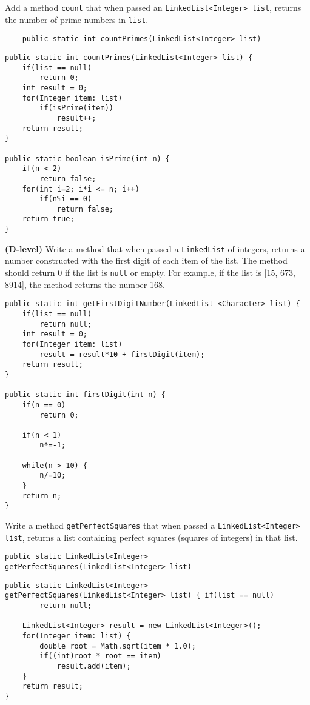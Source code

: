 \begin{questions}
\question Add a method \texttt{count} that when passed an \texttt{LinkedList<Integer> list}, returns the number of prime numbers in \texttt{list}.

\begin{lstlisting}
	public static int countPrimes(LinkedList<Integer> list)
\end{lstlisting}

\begin{solution}
\begin{lstlisting}
public static int countPrimes(LinkedList<Integer> list) {
	if(list == null)
		return 0;
	int result = 0;
	for(Integer item: list)
		if(isPrime(item))
			result++;
	return result;
}

public static boolean isPrime(int n) {
	if(n < 2)
		return false;
	for(int i=2; i*i <= n; i++)
		if(n%i == 0)
			return false;
	return true;
}
\end{lstlisting}
\end{solution}

\question \textbf{(D-level)} Write a method that when passed a \texttt{LinkedList} of integers, returns a number constructed with the first digit of each item of the list. The method should return 0 if the list is \texttt{null} or empty. For example, if the list is [15, 673, 8914], the method returns the number 168.

\begin{solution}
\begin{lstlisting}
public static int getFirstDigitNumber(LinkedList <Character> list) {
	if(list == null) 
		return null;
	int result = 0;
	for(Integer item: list)
		result = result*10 + firstDigit(item);
	return result;
}	

public static int firstDigit(int n) {
	if(n == 0)
		return 0;
		
	if(n < 1)
		n*=-1;
	
	while(n > 10) {
		n/=10;
	}
	return n;
}
\end{lstlisting}	
\end{solution}


\question  Write a method \texttt{getPerfectSquares} that when passed a \texttt{LinkedList<Integer> list}, returns a list containing perfect squares (squares of integers) in that list.

\begin{lstlisting}
public static LinkedList<Integer> getPerfectSquares(LinkedList<Integer> list)
\end{lstlisting}

\begin{solution}
\begin{lstlisting}
public static LinkedList<Integer> getPerfectSquares(LinkedList<Integer> list) {	if(list == null)
		return null;

	LinkedList<Integer> result = new LinkedList<Integer>();
	for(Integer item: list) {
		double root = Math.sqrt(item * 1.0);
		if((int)root * root == item)
			result.add(item);
	}
	return result;
}
\end{lstlisting}
\end{solution}
\end{questions}
	

